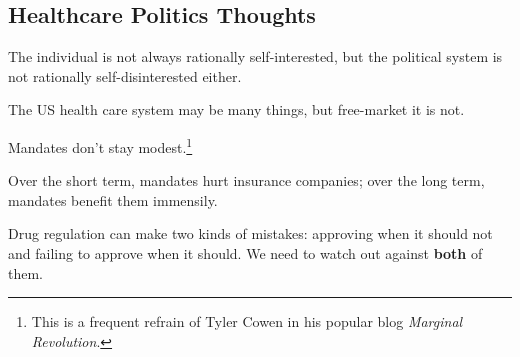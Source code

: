 \subsection{Healthcare Politics Thoughts}

\thought The individual is not always rationally self-interested, but the
political system is not rationally self-disinterested either.

\thought The US health care system may be many things, but free-market it is
not.

\thought Mandates don't stay modest.\footnote{This is a frequent refrain of
Tyler Cowen in his popular blog \emph{Marginal Revolution}.}

\thought Over the short term, mandates hurt insurance companies; over the long
term, mandates benefit them immensily.

\thought Drug regulation can make two kinds of mistakes: approving when it
should not and failing to approve when it should. We need to watch out against
\textbf{both} of them.


